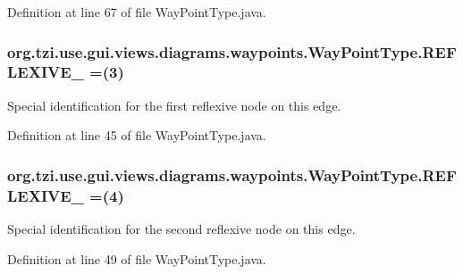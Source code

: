 Definition at line 67 of file Way\-Point\-Type.\-java.

\hypertarget{enumorg_1_1tzi_1_1use_1_1gui_1_1views_1_1diagrams_1_1waypoints_1_1_way_point_type_a6306a3c92a823d372dac09326cc88434}{
\subsubsection[{R\-E\-F\-L\-E\-X\-I\-V\-E\-\_\-1}]{\setlength{\rightskip}{0pt plus 5cm}org.\-tzi.\-use.\-gui.\-views.\-diagrams.\-waypoints.\-Way\-Point\-Type.\-R\-E\-F\-L\-E\-X\-I\-V\-E\-\_ =(3)}}\label{enumorg_1_1tzi_1_1use_1_1gui_1_1views_1_1diagrams_1_1waypoints_1_1_way_point_type_a6306a3c92a823d372dac09326cc88434}
Special identification for the first reflexive node on this edge. 

Definition at line 45 of file Way\-Point\-Type.\-java.

\hypertarget{enumorg_1_1tzi_1_1use_1_1gui_1_1views_1_1diagrams_1_1waypoints_1_1_way_point_type_a1e42ce4867ddf499ae8be81ee9c3b194}{
\subsubsection[{R\-E\-F\-L\-E\-X\-I\-V\-E\-\_\-2}]{\setlength{\rightskip}{0pt plus 5cm}org.\-tzi.\-use.\-gui.\-views.\-diagrams.\-waypoints.\-Way\-Point\-Type.\-R\-E\-F\-L\-E\-X\-I\-V\-E\-\_ =(4)}}\label{enumorg_1_1tzi_1_1use_1_1gui_1_1views_1_1diagrams_1_1waypoints_1_1_way_point_type_a1e42ce4867ddf499ae8be81ee9c3b194}
Special identification for the second reflexive node on this edge. 

Definition at line 49 of file Way\-Point\-Type.\-java.

